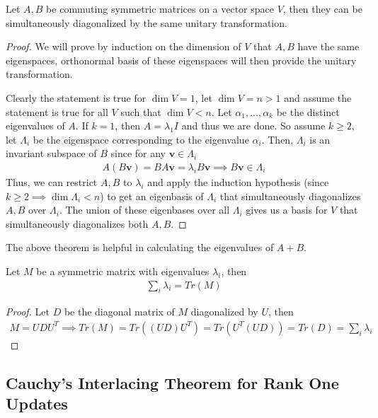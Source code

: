 \documentclass{math}
\renewcommand{\vec}[1]{\boldsymbol{#1}}
\begin{document}
\begin{theorem}
    Let $A, B$ be commuting symmetric matrices on a vector space $V$, then they can be simultaneously diagonalized by the same unitary transformation.
\end{theorem}
\begin{proof}
    We will prove by induction on the dimension of $V$ that $A, B$ have the same eigenspaces,
    orthonormal basis of these eigenspaces will then provide the unitary transformation.

    Clearly the statement is true for $\dim V = 1$, let $\dim V = n > 1$ and assume the statement is true for all $V$ such that $\dim V < n$.
    Let $\alpha_1, ..., \alpha_k$ be the distinct eigenvalues of $A$. If $k = 1$, then $A = \lambda_1 I$ and thus we are done.
    So assume $k \geq 2$, let $\Lambda_i$ be the eigenspace corresponding to the eigenvalue $\alpha_i$.
    Then, $\Lambda_i$ is an invariant subspace of $B$ since for any $\vec{v} \in \Lambda_i$
    \begin{align*}
        A(B\vec{v}) = BA\vec{v} = \lambda_i B \vec{v} \implies B\vec{v} \in \Lambda_i
    \end{align*}
    Thus, we can restrict $A, B$ to $\lambda_i$ and apply the induction hypothesis (since $k \geq 2 \implies \dim \Lambda_i < n$)
    to get an eigenbasis of $\Lambda_i$ that simultaneously diagonalizes $A, B$ over $\Lambda_i$. The union of these eigenbases over all $\Lambda_i$ gives us a basis for $V$
    that simultaneously diagonalizes both $A, B$.
\end{proof}

The above theorem is helpful in calculating the eigenvalues of $A + B$.

\begin{theorem}
    Let $M$ be a symmetric matrix with eigenvalues $\lambda_i$, then
    \begin{align*}
        \sum_i \lambda_i = Tr(M)
    \end{align*}
\end{theorem}
\begin{proof}
    Let $D$ be the diagonal matrix of $M$ diagonalized by $U$, then
    \begin{align*}
        M = UDU^T \implies Tr(M) = Tr((UD)U^T) = Tr(U^T (UD)) = Tr(D) = \sum_i \lambda_i
    \end{align*}
\end{proof}

\subsection{Cauchy's Interlacing Theorem for Rank One Updates}
\end{document}
